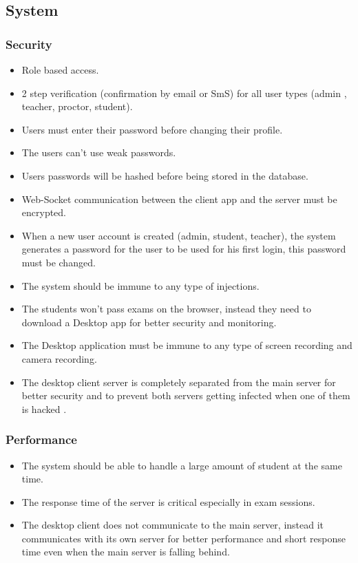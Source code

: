 \documentclass[]{uc2pfecaneva}
\begin{document}
    \raggedright\subsection{System}

    \raggedright\subsubsection{Security}
    \begin{itemize}
        \item Role based access.
        \item 2 step verification (confirmation by email or SmS) for all user types (admin , teacher, proctor, student).
        \item Users must enter their password before changing their profile.
        \item The users can't use weak passwords.
        \item Users passwords will be hashed before being stored in the database.
        \item Web-Socket communication between the client app and the server must be encrypted.
        \item When a new user account is created (admin, student, teacher), the system generates a password for the user to be used for his first login, this password must be changed.
        \item The system should be immune to any type of injections.
        \item The students won’t pass exams on the browser, instead they need to download a Desktop app for better security and monitoring.
        \item The Desktop application must be immune to any type of screen recording and camera recording.
        \item The desktop client server is completely separated from the main server for better security and to prevent both servers getting infected when one of them is hacked .
    \end{itemize}

    \raggedright\subsubsection{Performance}
    \begin{itemize}
        \item The system should be able to handle a large amount of student at the same time.
        \item The response time of the server is critical especially in exam sessions.
        \item The desktop client does not communicate to the main server, instead it communicates with its own server for better performance and short response time even when the main server is falling behind.
    \end{itemize}
\end{document}
